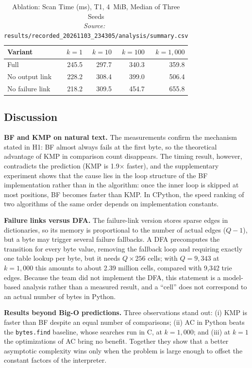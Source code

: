 \documentclass[conference]{IEEEtran}
\newcommand{\src}[1]{{\normalfont\footnotesize\emph{Source:}~\cite{data} {\scriptsize\texttt{#1}}}}
\newcommand{\RM}{results/recorded\_20261103\_234305}
\begin{document}
\begin{table}[t]
\caption{Ablation: Scan Time (ms), T1, 4~MiB, Median of Three Seeds\\ \src{\RM/analysis/summary.csv}}
\label{tab:abl}
\centering
\setlength{\tabcolsep}{4pt}
\begin{tabular}{@{}lrrrr@{}}
\toprule
Variant & $k=1$ & $k=10$ & $k=100$ & $k=1{,}000$ \\
\midrule
Full & 245.5 & 297.7 & 340.3 & 359.8 \\
No output link & 228.2 & 308.4 & 399.0 & 506.4 \\
No failure link & 218.2 & 309.5 & 454.7 & 655.8 \\
\bottomrule
\end{tabular}
\end{table}

\subsection{Discussion}
\label{sec:discussion}
\textbf{BF and KMP on natural text.} The measurements confirm the mechanism stated in H1: BF almost always fails at the first byte, so the theoretical advantage of KMP in comparison count disappears. The timing result, however, contradicts the prediction (KMP is 1.9$\times$ faster), and the supplementary experiment shows that the cause lies in the loop structure of the BF implementation rather than in the algorithm: once the inner loop is skipped at most positions, BF becomes faster than KMP. In CPython, the speed ranking of two algorithms of the same order depends on implementation constants.

\textbf{Failure links versus DFA.} The failure-link version stores sparse edges in dictionaries, so its memory is proportional to the number of actual edges ($Q-1$), but a byte may trigger several failure fallbacks. A DFA precomputes the transition for every byte value, removing the fallback loop and requiring exactly one table lookup per byte, but it needs $Q\times 256$ cells; with $Q=9{,}343$ at $k=1{,}000$ this amounts to about 2.39 million cells, compared with 9{,}342 trie edges. Because the team did not implement the DFA, this statement is a model-based analysis rather than a measured result, and a ``cell'' does not correspond to an actual number of bytes in Python.

\textbf{Results beyond Big-O predictions.} Three observations stand out: (i) KMP is faster than BF despite an equal number of comparisons; (ii) AC in Python beats the \texttt{bytes.find} baseline, whose searches run in C, at $k=1{,}000$; and (iii) at $k=1$ the optimizations of AC bring no benefit. Together they show that a better asymptotic complexity wins only when the problem is large enough to offset the constant factors of the interpreter.
\end{document}
